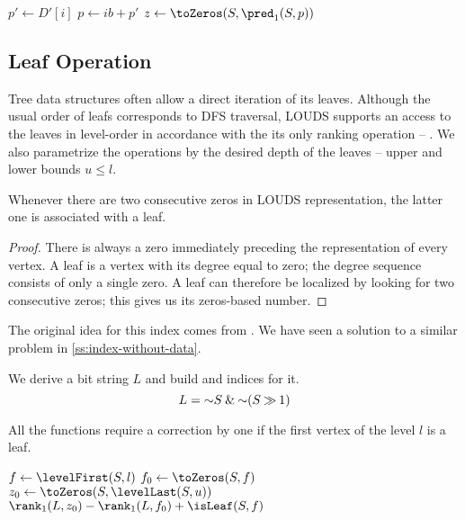 \begin{algorithmic}
 
	\State $p' \gets D'[i]$
	 
		\State {}
	\Else
		\State $p \gets i b + p'$
		 
			\State {} 
		\Else
			\State $z \gets \toZeros(S, \pred_1(S, p))$
			 
				\State {}
			\Else
				\State \Return{$\blockOfD[S[i b : (i + 1) b], p', z \% b]$}
			\EndIf
		\EndIf
	\EndIf
\EndFunction
\end{algorithmic}

\subsection{\label{ss:leaf-queries}Leaf Operation}

Tree data structures often allow a direct iteration of its leaves.
Although the usual order of leafs corresponds to DFS traversal, LOUDS supports an access to the leaves in level-order in accordance with the its only ranking operation -- \inRank{}.
We also parametrize the operations by the desired depth of the leaves -- upper and lower bounds $u \le l$.

\begin{lemma}
	Whenever there are two consecutive zeros in LOUDS representation, the latter one is associated with a leaf.
\end{lemma}
\begin{proof}
	There is always a zero immediately preceding the representation of every vertex.
	A leaf is a vertex with its degree equal to zero; the degree sequence consists of only a single zero.
	A leaf can therefore be localized by looking for two consecutive zeros; this gives us its zeros-based number.
\end{proof}

The original idea for this index comes from \cite{munro1998space}.
We have seen a solution to a similar problem in \ref{ss:index-without-data}.

We derive a bit string $L$ and build \rank{} and \select{} indices for it.
$$L = \mathord{\sim} S \mathbin{\&} \mathord{\sim} (S \mathbin{\gg} 1)$$

All the functions require a correction by one if the first vertex of the level $l$ is a leaf.

\begin{algorithmic}
	\State $f \gets \levelFirst(S, l)$ 
	\State $f_0 \gets \toZeros(S, f)$
	\State $z_0 \gets \toZeros(S, \levelLast(S, u))$
	\State \Return $\rank_1(L, z_0) - \rank_1(L, f_0) + \isLeaf(S, f)$
\EndFunction
\end{algorithmic}

